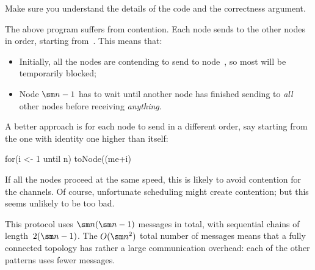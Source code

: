 \begin{instruction}
Make sure you understand the details of the code and the correctness
argument.
\end{instruction}


The above program suffers from contention.  Each node sends to the other nodes
in order, starting from~.  This means that:
%
\begin{itemize}
\item
Initially, all the nodes are contending to send to node~, so most
will be temporarily blocked;

\item
Node $\sm n-1$ has to wait until another node has finished sending to
\emph{all} other nodes before receiving \emph{anything}.  %
\end{itemize}

A better approach is for each node to send in a different order, say starting
from the one with identity one higher than itself:
%
\begin{scala}
  for(i <- 1 until n) toNode((me+i)%
\end{scala}
%
If all the nodes proceed at the same speed, this is likely to avoid contention
for the channels.  Of course, unfortunate scheduling might create
contention; but this seems unlikely to be too bad. 


This protocol uses $\sm n(\sm n-1)$ messages in total, with sequential chains
of length~$2(\sm n -1)$.  The $O(\sm n^2)$ total number of messages means that
a fully connected topology has rather a large communication overhead: each of
the other patterns uses fewer messages. 
